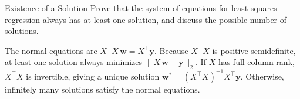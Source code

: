 \documentclass{article}
\begin{document}
\begin{exercise}{Existence of a Solution}
  Prove that the system of equations for least squares regression always has at least one solution, and discuss the possible number of solutions.
  
  \begin{solution}
    The normal equations are $X^\top X\,\mathbf{w} = X^\top \mathbf{y}.$ 
    Because $X^\top X$ is positive semidefinite, at least one solution always minimizes $\|X\,\mathbf{w} - \mathbf{y}\|_2.$ 
    If $X$ has full column rank, $X^\top X$ is invertible, giving a unique solution 
    $\mathbf{w}^* = (X^\top X)^{-1} X^\top \mathbf{y}.$ 
    Otherwise, infinitely many solutions satisfy the normal equations.
  \end{solution}
\end{exercise}
\end{document}
